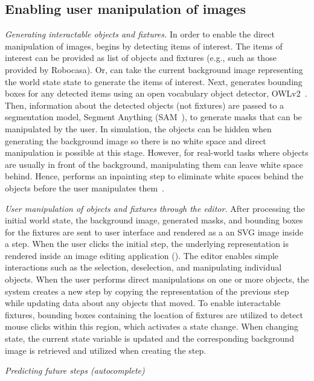\subsection{Enabling user manipulation of images}
\emph{Generating interactable objects and fixtures.} In order to enable the direct manipulation of images, \projname begins by detecting items of interest. The items of interest can be provided as list of objects and fixtures (e.g., such as those provided by Robocasa). Or, \projname can take the current background image representing the world state state to generate the items of interest. Next, \projname generates bounding boxes for any detected items using an open vocabulary object detector, OWLv2~\cite{minderer2024scaling}. Then, information about the detected objects (not fixtures) are passed to a segmentation model, Segment Anything (SAM~\cite{kirillov2023segment}), to generate masks that can be manipulated by the user. In simulation, the objects can be hidden when generating the background image so there is no white space and direct manipulation is possible at this stage. However, for real-world tasks where objects are usually in front of the background, manipulating them can leave white space behind. Hence, \projname performs an inpainting step to eliminate white spaces behind the objects before the user manipulates them~\cite{suvorov2022resolution}. 

\emph{User manipulation of objects and fixtures through the editor.} After processing the initial world state, the background image, generated masks, and bounding boxes for the fixtures are sent to user interface and rendered as a an SVG image inside a step. When the user clicks the initial step, the underlying representation is rendered inside an image editing application (). The editor enables simple interactions such as the selection, deselection, and manipulating individual objects. When the user performs direct manipulations on one or more objects, the system creates a new step by copying the representation of the previous step while updating data about any objects that moved. To enable interactable fixtures, bounding boxes containing the location of fixtures are utilized to detect mouse clicks within this region, which activates a state change. When changing state, the current state variable is updated and the corresponding background image is retrieved and utilized when creating the step.

\emph{Predicting future steps (autocomplete)}



